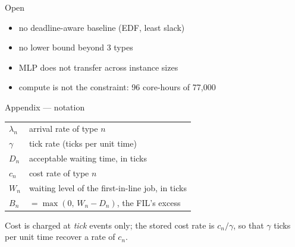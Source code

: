 \documentclass[12pt,aspectratio=169]{beamer}
\begin{document}
\begin{frame}{Open}

\begin{itemize}
  \Large
  \item no deadline-aware baseline (EDF, least slack)
  \vfill
  \item no lower bound beyond 3 types
  \vfill
  \item MLP does not transfer across instance sizes
  \vfill
  \item compute is not the constraint: 96 core-hours of 77{,}000
\end{itemize}

\end{frame}

\appendix

\begin{frame}{Appendix --- notation}

\begin{center}
\begin{tabular}{ll}
\toprule
$\lambda_n$ & arrival rate of type $n$ \\
$\gamma$    & tick rate (ticks per unit time) \\
$D_n$       & acceptable waiting time, in ticks \\
$c_n$       & cost rate of type $n$ \\
$W_n$       & waiting level of the first-in-line job, in ticks \\
$B_n$       & $= \max(0,\, W_n - D_n)$, the FIL's excess \\
\bottomrule
\end{tabular}
\end{center}

\vfill
Cost is charged at \emph{tick} events only; the stored cost rate is $c_n/\gamma$,
so that $\gamma$ ticks per unit time recover a rate of $c_n$.

\end{frame}
\end{document}

